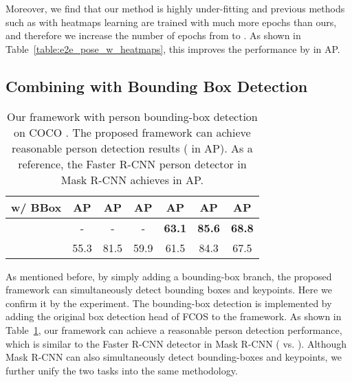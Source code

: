 \documentclass[10pt,twocolumn,letterpaper]{article}
\renewcommand{\texttt}[1]{}
\newcommand{\1}{{\mathbbm{1}}}
\begin{document}
{Moreover, we find that our method is highly under-fitting and previous methods such as \cite{sun2019deep} with heatmaps learning are trained with much more epochs than ours, and therefore we increase the number of epochs from  to . As shown in Table~\ref{table:e2e_pose_w_heatmaps}, this improves the performance by  in AP.
\subsection{Combining with Bounding Box Detection}
\begin{table}
	\small
	\begin{center}
	\begin{tabular}{ c | c c c | c c c}
		\hline
		w/ BBox & AP & AP & AP & AP & AP & AP \\
		\hline\hline
		 & - & - & - & \textbf{63.1} & \textbf{85.6} & \textbf{68.8} \\
		\checkmark & 55.3 & 81.5 & 59.9 & 61.5 & 84.3 & 67.5 \\
		\hline
	\end{tabular}
	\end{center}
	\caption{Our framework with person bounding-box detection on COCO \texttt{minival}. The proposed framework can achieve reasonable person detection results ( in AP). As a reference, the Faster R-CNN person detector in Mask R-CNN \cite{he2017mask} achieves  in AP.}
	\label{table:e2e_pose_w_bbox}
\end{table}
As mentioned before, by simply adding a bounding-box branch, the proposed framework can simultaneously detect bounding boxes and keypoints. Here we confirm it by the experiment. The bounding-box detection is implemented by adding the original box detection head of FCOS to the framework. As shown in Table~\ref{table:e2e_pose_w_bbox}, our framework can achieve a reasonable person detection performance, which is similar to the Faster R-CNN detector in Mask R-CNN ( vs. ). Although Mask R-CNN can also simultaneously detect bounding-boxes and keypoints, we further unify the two tasks into the same methodology.
}
\end{document}
